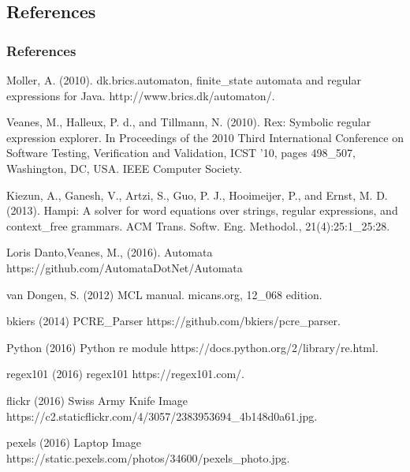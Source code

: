 \subsection{References}



\begin{frame}[allowframebreaks]
\frametitle{References}
\footnotesize{
\begin{thebibliography}{99}

 Moller, A. (2010).
\newblock dk.brics.automaton, finite\_state automata and regular expressions for Java.
\newblock http://www.brics.dk/automaton/.

 Veanes, M., Halleux, P. d., and Tillmann, N. (2010).
\newblock Rex: Symbolic regular expression explorer.
\newblock In Proceedings of the 2010 Third International Conference on Software Testing, Verification and Validation, ICST ’10, pages 498\_507, Washington, DC, USA. IEEE Computer Society.

 Kiezun, A., Ganesh, V., Artzi, S., Guo, P. J., Hooimeijer, P., and Ernst, M. D. (2013).
\newblock Hampi: A solver for word equations over strings, regular expressions, and context\_free grammars.
\newblock ACM Trans. Softw. Eng. Methodol., 21(4):25:1\_25:28.

 Loris Danto,Veanes, M., (2016).
\newblock Automata
\newblock https://github.com/AutomataDotNet/Automata

 van Dongen, S. (2012)
\newblock MCL manual.
\newblock micans.org, 12\_068 edition.

 bkiers (2014)
\newblock PCRE\_Parser
\newblock https://github.com/bkiers/pcre\_parser.

 Python (2016)
\newblock Python re module
\newblock https://docs.python.org/2/library/re.html.

 regex101 (2016)
\newblock regex101
\newblock https://regex101.com/.


 flickr (2016)
\newblock Swiss Army Knife Image
\newblock https://c2.staticflickr.com/4/3057/2383953694\_4b148d0a61.jpg.

 pexels (2016)
\newblock Laptop Image
\newblock https://static.pexels.com/photos/34600/pexels\_photo.jpg.


\end{thebibliography}}
\end{frame}
